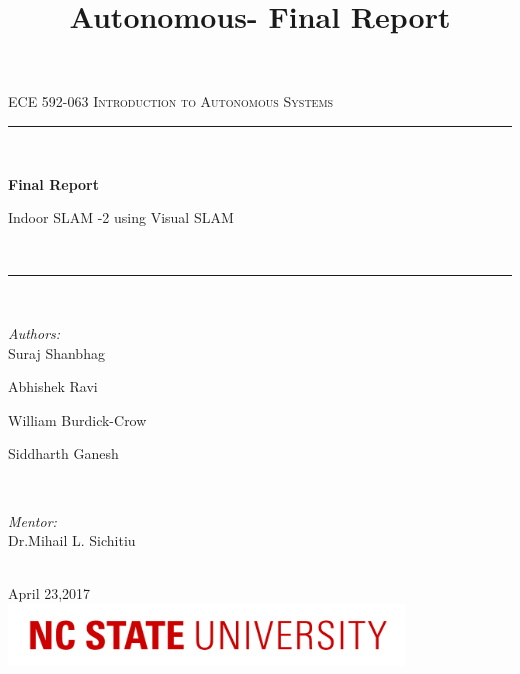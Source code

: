 \documentclass[10pt]{article}
\title{Autonomous- Final Report}
\begin{document}
\begin{titlepage}

\newcommand{\HRule}{\rule{\linewidth}{0.5mm}} %
\center %
\textsc{\Large ECE 592-063 Introduction to Autonomous Systems}\\[1.5cm]
\HRule \\[0.4cm]
{ \huge \bfseries Final Report 

Indoor SLAM -2 using Visual SLAM}\\[0.4cm] %
\HRule \\[1.5cm]
\begin{minipage}{0.4\textwidth}
\begin{flushleft} \large
\emph{Authors:}\\
Suraj Shanbhag %

Abhishek Ravi	 %

William Burdick-Crow %

Siddharth Ganesh %

\end{flushleft}
\end{minipage}
~
\begin{minipage}{0.4\textwidth}
\begin{flushright} \large
\emph{Mentor:} \\
Dr.Mihail L. Sichitiu %
\end{flushright}
\end{minipage}\\[0.5cm]
{\large April 23,2017}\\[2cm] 
\includegraphics[width=10.5cm]{n.png} %
 
\vfill %

\end{titlepage}

\tableofcontents



\listoffigures



\listoftables
\pagebreak
\end{document}
